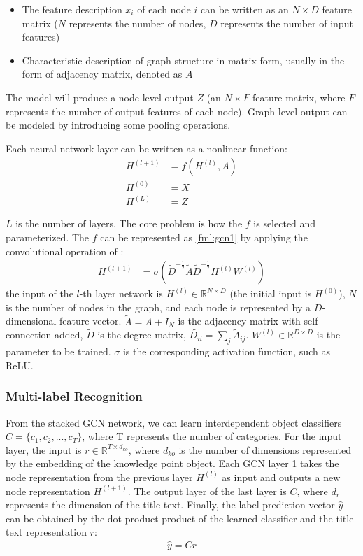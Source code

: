 \begin{itemize}
	\item The feature description \(x_i\) of each node \(i\) can be written as an \(N\times D\) feature matrix (\(N\) represents the number of nodes, \(D\) represents the number of input features)
	\item Characteristic description of graph structure in matrix form, usually in the form of adjacency matrix, denoted as $A$
\end{itemize}

The model will produce a node-level output $Z$ (an $N\times F$ feature matrix, where $F$ represents the number of output features of each node). Graph-level output can be modeled by introducing some pooling operations.

Each neural network layer can be written as a nonlinear function:
\begin{align}
	H^{(l+1)} & =f\left(H^{(l)}, A\right) \\
	H^{(0)}   & =X                        \\
	H^{(L)}   & =Z
\end{align}

$L$ is the number of layers. The core problem is how the $f$ is selected and parameterized. The $f$ can be represented as \ref{fml:gcn1} by applying the convolutional operation of \cite{kipf2016semi}:
\begin{align}
	H^{(l+1)} & =\sigma\left(\tilde{D}^{-\frac{1}{2}} \tilde{A} \tilde{D}^{-\frac{1}{2}} H^{(l)} W^{(l)}\right)\label{fml:gcn1}
\end{align}
the input of the $l$-th layer network is $H^{(l)}\in \mathbb{R}^{N\times D}$ (the initial input is $H^{(0)}$), $N$ is the number of nodes in the graph, and each node is represented by a $D$-dimensional feature vector. $\tilde{A}=A+I_N$ is the adjacency matrix with self-connection added, $\tilde{D}$ is the degree matrix, $\tilde{D_{ii}}=\sum_{j}{\tilde{A}_{ij}}$. $W^{(l)}\in \mathbb{R}^{D\times D}$ is the parameter to be trained. $\sigma$ is the corresponding activation function, such as ReLU.

\subsubsection{Multi-label Recognition}
From the stacked GCN network, we can learn interdependent object classifiers $C=\{c_1,c_2,...,c_T\}$, where T represents the number of categories. For the input layer, the input is $r\in \mathbb{R}^{T \times d_{ko}}$, where $d_{ko}$ is the number of dimensions represented by the embedding of the knowledge point object. Each GCN layer 1 takes the node representation from the previous layer $H^{(l)}$ as input and outputs a new node representation $H^{(l+1)}$. The output layer of the last layer is $C$, where $d_r$ represents the dimension of the title text. Finally, the label prediction vector  $\hat{y}$ can be obtained by the dot product product of the learned classifier and the title text representation $r$:
\begin{align}
	\hat{y} = C r
\end{align}


